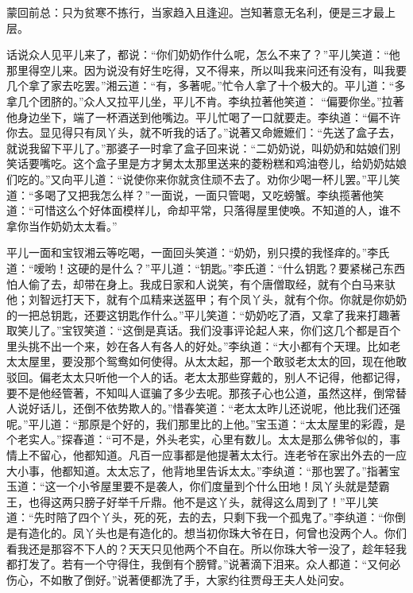 
\begin{parag}
    \begin{note}蒙回前总：只为贫寒不拣行，当家趋入且逢迎。岂知著意无名利，便是三才最上层。\end{note}
\end{parag}


\begin{parag}
    话说众人见平儿来了，都说：“你们奶奶作什么呢，怎么不来了？”平儿笑道：“他那里得空儿来。因为说没有好生吃得，又不得来，所以叫我来问还有没有，叫我要几个拿了家去吃罢。”湘云道：“有，多著呢。”忙令人拿了十个极大的。平儿道：“多拿几个团脐的。”众人又拉平儿坐，平儿不肯。李纨拉著他笑道： “偏要你坐。”拉著他身边坐下，端了一杯酒送到他嘴边。平儿忙喝了一口就要走。李纨道：“偏不许你去。显见得只有凤丫头，就不听我的话了。”说著又命嬷嬷们：“先送了盒子去，就说我留下平儿了。”那婆子一时拿了盒子回来说：“二奶奶说，叫奶奶和姑娘们别笑话要嘴吃。这个盒子里是方才舅太太那里送来的菱粉糕和鸡油卷儿，给奶奶姑娘们吃的。”又向平儿道：“说使你来你就贪住顽不去了。劝你少喝一杯儿罢。”平儿笑道：“多喝了又把我怎么样？”一面说，一面只管喝，又吃螃蟹。李纨揽著他笑道：“可惜这么个好体面模样儿，命却平常，只落得屋里使唤。不知道的人，谁不拿你当作奶奶太太看。”
\end{parag}


\begin{parag}
    平儿一面和宝钗湘云等吃喝，一面回头笑道：“奶奶，别只摸的我怪痒的。”李氏道：“嗳哟！这硬的是什么？”平儿道：“钥匙。”李氏道：“什么钥匙？要紧梯己东西怕人偷了去，却带在身上。我成日家和人说笑，有个唐僧取经，就有个白马来驮他；刘智远打天下，就有个瓜精来送盔甲；有个凤丫头，就有个你。你就是你奶奶的一把总钥匙，还要这钥匙作什么。”平儿笑道：“奶奶吃了酒，又拿了我来打趣著取笑儿了。”宝钗笑道：“这倒是真话。我们没事评论起人来，你们这几个都是百个里头挑不出一个来，妙在各人有各人的好处。”李纨道：“大小都有个天理。比如老太太屋里，要没那个鸳鸯如何使得。从太太起，那一个敢驳老太太的回，现在他敢驳回。偏老太太只听他一个人的话。老太太那些穿戴的，别人不记得，他都记得，要不是他经管著，不知叫人诓骗了多少去呢。那孩子心也公道，虽然这样，倒常替人说好话儿，还倒不依势欺人的。”惜春笑道：“老太太昨儿还说呢，他比我们还强呢。”平儿道：“那原是个好的，我们那里比的上他。”宝玉道：“太太屋里的彩霞，是个老实人。”探春道：“可不是，外头老实，心里有数儿。太太是那么佛爷似的，事情上不留心，他都知道。凡百一应事都是他提著太太行。连老爷在家出外去的一应大小事，他都知道。太太忘了，他背地里告诉太太。”李纨道：“那也罢了。”指著宝玉道：“这一个小爷屋里要不是袭人，你们度量到个什么田地！凤丫头就是楚霸王，也得这两只膀子好举千斤鼎。他不是这丫头，就得这么周到了！”平儿笑道：“先时陪了四个丫头，死的死，去的去，只剩下我一个孤鬼了。”李纨道：“你倒是有造化的。凤丫头也是有造化的。想当初你珠大爷在日，何曾也没两个人。你们看我还是那容不下人的？天天只见他两个不自在。所以你珠大爷一没了，趁年轻我都打发了。若有一个守得住，我倒有个膀臂。”说著滴下泪来。众人都道：“又何必伤心，不如散了倒好。”说著便都洗了手，大家约往贾母王夫人处问安。
\end{parag}


